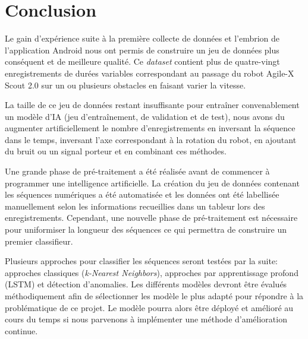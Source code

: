 \section{Conclusion}
Le gain d'expérience suite à la première collecte de données et l'embrion de l'application Android nous ont permis de construire un jeu de données plus conséquent et de meilleure qualité. Ce \textit{dataset} contient plus de quatre-vingt enregistrements de durées variables correspondant au passage du robot Agile-X Scout 2.0 sur un ou plusieurs obstacles en faisant varier la vitesse.

La taille de ce jeu de données restant insuffisante pour entraîner convenablement un modèle d'IA (jeu d'entraînement, de validation et de test), nous avons du augmenter artificiellement le nombre d'enregistrements en inversant la séquence dans le temps, inversant l'axe correspondant à la rotation du robot, en ajoutant du bruit ou un signal porteur et en combinant ces méthodes.

Une grande phase de pré-traitement a été réalisée avant de commencer à programmer une intelligence artificielle. La création du jeu de données contenant les séquences numériques a été automatisée et les données ont été labellisée manuellement selon les informations recueillies dans un tableur lors des enregistrements.
Cependant, une nouvelle phase de pré-traitement est nécessaire pour uniformiser la longueur des séquences ce qui permettra de construire un premier classifieur.

Plusieurs approches pour classifier les séquences seront testées par la suite: approches classiques (\textit{k-Nearest Neighbors}), approches par apprentissage profond (LSTM) et détection d'anomalies. Les différents modèles devront être évalués méthodiquement afin de sélectionner les modèle le plus adapté pour répondre à la problématique de ce projet. Le modèle pourra alors être déployé et amélioré au cours du temps si nous parvenons à implémenter une méthode d'amélioration continue.